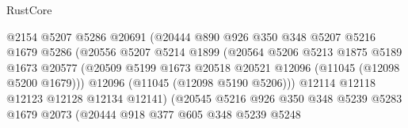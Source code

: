 \begin{lexlean}{RustCore}
\begin{coremodule}
                                    @2154
                                    @5207
                                    @5286
                                    @20691
                                    (@20444
                                      @890
                                      @926
                                      @350
                                      @348
                                      @5207
                                      @5216
                                      @1679
                                      @5286
                                      (@20556
                                        @5207
                                        @5214
                                        @1899
                                        (@20564
                                          @5206
                                          @5213
                                          @1875
                                          @5189
                                          @1673
                                          @20577
                                          (@20509
                                            @5199
                                            @1673
                                            @20518
                                            @20521
                                            @12096
                                            (@11045 (@12098 @5200 @1679)))
                                          @12096
                                          (@11045 (@12098 @5190 @5206)))
                                        @12114
                                        @12118
                                        @12123
                                        @12128
                                        @12134
                                        @12141)
                                      (@20545
                                        @5216
                                        @926
                                        @350
                                        @348
                                        @5239
                                        @5283
                                        @1679
                                        @2073
                                        (@20444
                                          @918
                                          @377
                                          @605
                                          @348
                                          @5239
                                          @5248

\end{coremodule}
\end{lexlean}
